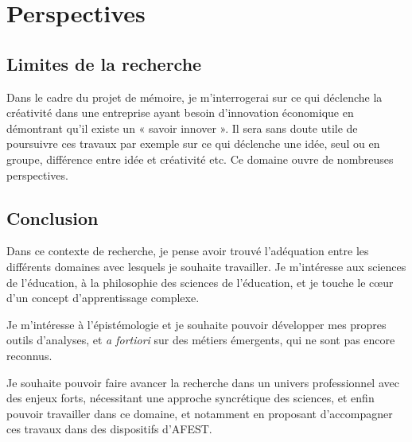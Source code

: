 \documentclass{article}
\begin{document}
\section{Perspectives}

\subsection{Limites de la recherche}

Dans le cadre du projet de mémoire, je m'interrogerai sur ce qui déclenche la créativité dans une entreprise ayant besoin d'innovation économique en démontrant qu'il existe un « savoir innover ». Il sera sans doute utile de poursuivre ces travaux par exemple sur ce qui déclenche une idée, seul ou en groupe, différence entre idée et créativité etc. Ce domaine ouvre de nombreuses perspectives.  

\subsection{Conclusion}

Dans ce contexte de recherche, je pense avoir trouvé l'adéquation entre les différents domaines avec lesquels je souhaite travailler. Je m'intéresse aux sciences de l'éducation, à la philosophie des sciences de l'éducation, et je touche le cœur d'un concept d'apprentissage complexe.

Je m'intéresse à l'épistémologie et je souhaite pouvoir développer mes propres outils d'analyses, et \emph{a fortiori} sur des métiers émergents, qui ne sont pas encore reconnus.

Je souhaite pouvoir faire avancer la recherche dans un univers professionnel avec des enjeux forts, nécessitant une approche syncrétique des sciences, et enfin pouvoir travailler dans ce domaine, et notamment en proposant d'accompagner ces travaux dans des dispositifs d'AFEST.
\end{document}
